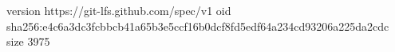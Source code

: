 version https://git-lfs.github.com/spec/v1
oid sha256:e4c6a3dc3fcbbcb41a65b3e5ccf16b0dcf8fd5edf64a234cd93206a225da2cdc
size 3975
